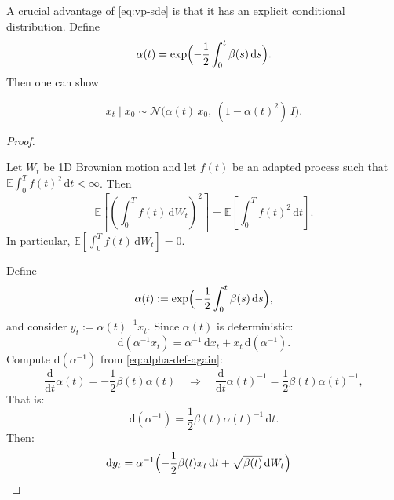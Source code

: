 \documentclass[../main]{subfiles}
\begin{document}
A crucial advantage of \eqref{eq:vp-sde} is that it has an explicit conditional distribution.
Define
\begin{equation}\label{eq:alpha-def}
    \alpha(t) = \exp\Bigl(-\frac{1}{2}\int_0^t \beta(s)\,\mathrm ds\Bigr).
\end{equation}
Then one can show
\begin{theorem}
\begin{equation}\label{eq:vp-marginal}
    x_t \mid x_0 \sim \mathcal N\!\bigl(\alpha(t)\,x_0,\ (1-\alpha(t)^2)\,I\bigr).
\end{equation}
\end{theorem}
\begin{proof}
    \begin{lemma}[It\^{o} isometry]
        Let $W_t$ be 1D Brownian motion and let $f(t)$ be an adapted process such that
        $\mathbb E\int_0^T f(t)^2\,\mathrm dt<\infty$. Then
        \begin{equation}
            \mathbb E\left[\left(\int_0^T f(t)\,\mathrm dW_t\right)^2\right]
            =
            \mathbb E\left[\int_0^T f(t)^2\,\mathrm dt\right].
        \end{equation}
        In particular, $\mathbb E\!\left[\int_0^T f(t)\,\mathrm dW_t\right]=0$.
        \end{lemma}
    Define
    \begin{equation}\label{eq:alpha-def-again}
        \alpha(t) := \exp\Bigl(-\frac12\int_0^t \beta(s)\,\mathrm ds\Bigr),
    \end{equation}
    and consider $y_t := \alpha(t)^{-1}x_t$. Since $\alpha(t)$ is deterministic:
    \begin{equation}
        \mathrm d(\alpha^{-1}x_t) = \alpha^{-1}\,\mathrm d x_t + x_t\,\mathrm d(\alpha^{-1}).
    \end{equation}
    Compute $\mathrm d(\alpha^{-1})$ from \eqref{eq:alpha-def-again}:
    \begin{equation}
        \frac{\mathrm d}{\mathrm dt}\alpha(t) = -\frac12\beta(t)\alpha(t)
        \quad\Rightarrow\quad
        \frac{\mathrm d}{\mathrm dt}\alpha(t)^{-1} = \frac12\beta(t)\alpha(t)^{-1},
    \end{equation}
    That is:
    \begin{equation}
        \mathrm d(\alpha^{-1}) = \frac12\beta(t)\alpha(t)^{-1}\,\mathrm dt.
    \end{equation}
    Then:
    \begin{align}
        \mathrm d y_t
        &= \alpha^{-1}\Bigl(-\frac12\beta(t)x_t\,\mathrm dt + \sqrt{\beta(t)}\,\mathrm dW_t\Bigr)

\end{align}
\end{proof}
\end{document}
